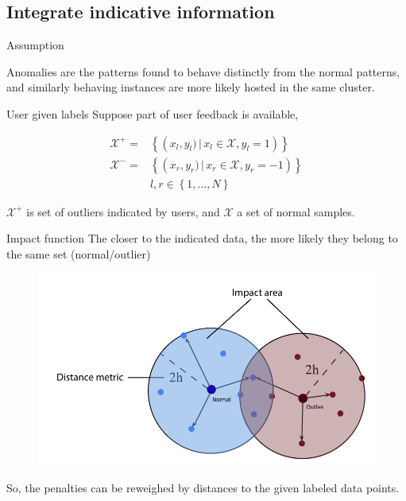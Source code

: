 \subsection{Integrate indicative information}
\begin{frame}{Assumption}
\begin{block}{ }
Anomalies are the patterns found to behave distinctly from the normal patterns, and similarly behaving instances are more likely hosted in the same cluster. 
\end{block}
\end{frame}
\begin{frame}{User given labels}
Suppose part of user feedback is available, 
\begin{center}
\begin{align*}
\mathcal{X^+}=&\left\lbrace \left( x_l, y_l) \,|\,  x_l \in \mathcal{X}, y_l=1 \right)\right\rbrace\\
\mathcal{X^-}=&\left\lbrace \left( x_r, y_r) \,|\, x_r \in \mathcal{X}, y_r=-1\right)\right\rbrace\\
&l, r \in \left\lbrace 1,\ldots ,N\right\rbrace
\end{align*}
\end{center}
$\mathcal{X^+}$ is set of outliers indicated by users, and $\mathcal{X}$ a set of normal samples.
\end{frame}
\begin{frame}{Impact function}
The closer to the indicated data, the more likely they belong to the same set (normal/outlier)
\begin{figure}
\centering
\includegraphics[scale=0.5]{imgs/indicative2.pdf}
\end{figure}
\vskip10pt
\pause
\color{blue}So, the penalties can be reweighed by distances to the given labeled data points.
\end{frame}

